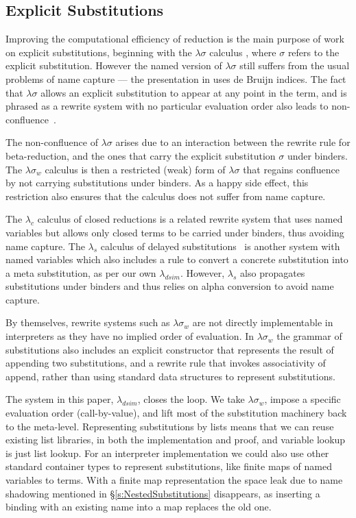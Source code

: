 \subsection{Explicit Substitutions}
Improving the computational efficiency of reduction is the main purpose of work on explicit substitutions, beginning with the $\lambda \sigma$ calculus \cite{Abadi:explicit-substitutions}, where $\sigma$ refers to the explicit substitution. However the named version of $\lambda \sigma$ still suffers from the usual problems of name capture --- the presentation in \cite{Abadi:explicit-substitutions} uses de Bruijn indices. The fact that $\lambda\sigma$ allows an explicit substitution to appear at any point in the term, and is phrased as a rewrite system with no particular evaluation order also leads to non-confluence~\cite{Mellies:not-terminate}. 

The non-confluence of $\lambda\sigma$ arises due to an interaction between the rewrite rule for beta-reduction, and the ones that carry the explicit substitution $\sigma$ under binders. The $\lambda\sigma_{w}$ calculus \cite{Curien:explicit-substitutions} is then a restricted (weak) form of $\lambda\sigma$ that regains confluence by not carrying substitutions under binders. As a happy side effect, this restriction also ensures that the calculus does not suffer from name capture.

The $\lambda_c$ calculus of closed reductions \cite{Fernandez:closed-reductions} is a related rewrite system that uses named variables but allows only closed terms to be carried under binders, thus avoiding name capture. The $\lambda_s$ calculus of delayed substitutions~\cite{Santo:delayed-substitutions} is another system with named variables which also includes a rule to convert a concrete substitution into a meta substitution, as per our own $\lambda_{dsim}$. However, $\lambda_s$ also propagates substitutions under binders and thus relies on alpha conversion to avoid name capture.

By themselves, rewrite systems such as $\lambda\sigma_{w}$ are not directly implementable in interpreters as they have no implied order of evaluation. In $\lambda\sigma_{w}$ the grammar of substitutions also includes an explicit constructor that represents the result of appending two substitutions, and a rewrite rule that invokes associativity of append, rather than using standard data structures to represent substitutions.

The system in this paper, $\lambda_{dsim}$, closes the loop. We take $\lambda\sigma_{w}$, impose a specific evaluation order (call-by-value), and lift most of the substitution machinery back to the meta-level. Representing substitutions by lists means that we can reuse existing list libraries, in both the implementation and proof, and variable lookup is just list lookup. For an interpreter implementation we could also use other standard container types to represent substitutions, like finite maps of named variables to terms. With a finite map representation the space leak due to name shadowing mentioned in \S\ref{s:NestedSubstitutions} disappears, as inserting a binding with an existing name into a map replaces the old one.

